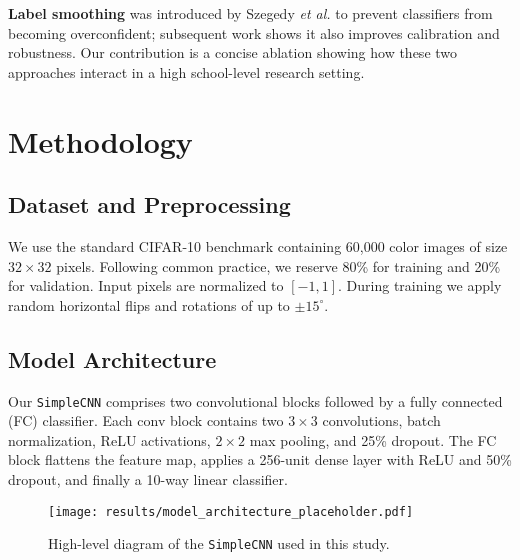 \documentclass[11pt]{article}
\begin{document}
\textbf{Label smoothing} was introduced by Szegedy \textit{et al.}\cite{szegedy2016} to prevent classifiers from becoming overconfident; subsequent work shows it also improves calibration and robustness. Our contribution is a concise ablation showing how these two approaches interact in a high school-level research setting.

\section{Methodology}
\subsection{Dataset and Preprocessing}
We use the standard CIFAR-10 benchmark containing 60,000 color images of size $32\times32$ pixels. Following common practice, we reserve 80\% for training and 20\% for validation. Input pixels are normalized to $[-1,1]$. During training we apply random horizontal flips and rotations of up to $\pm15^\circ$.

\subsection{Model Architecture}
Our \texttt{SimpleCNN} comprises two convolutional blocks followed by a fully connected (FC) classifier. Each conv block contains two $3\times3$ convolutions, batch normalization, ReLU activations, $2\times2$ max pooling, and 25\% dropout. The FC block flattens the feature map, applies a 256-unit dense layer with ReLU and 50\% dropout, and finally a 10-way linear classifier.

\begin{figure}[h]
  \centering
  \texttt{[image: results/model\_architecture\_placeholder.pdf]}
  \caption{High-level diagram of the \texttt{SimpleCNN} used in this study.}
  \label{fig:arch}
\end{figure}
\end{document}
